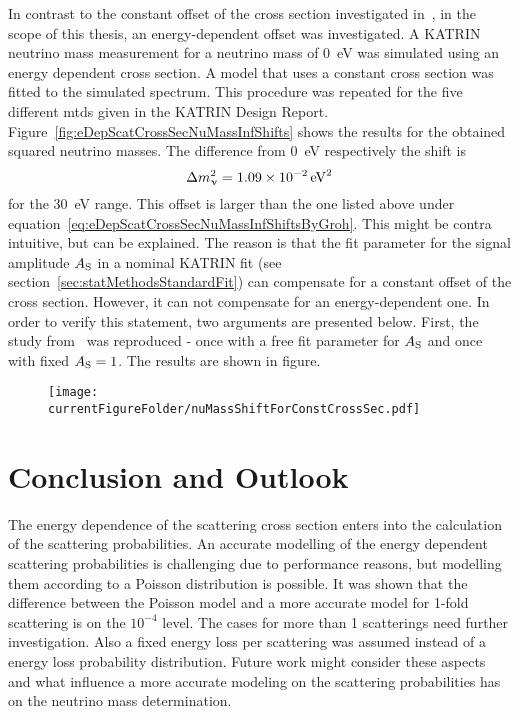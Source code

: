 In contrast to the constant offset of the cross section investigated in~\cite{Groh2015}, in the scope of this thesis, an energy-dependent offset was investigated. A KATRIN neutrino mass measurement for a neutrino mass of \SI{0}{eV} was simulated using an energy dependent cross section. A model that uses a constant cross section was fitted to the simulated spectrum. This procedure was repeated for the five different \gls{mtd}s given in the KATRIN Design Report. Figure~\ref{fig:eDepScatCrossSecNuMassInfShifts} shows the results for the obtained squared neutrino masses. The difference from \SI{0}{eV} respectively the shift is
\begin{equation}
	\Delta m_\upnu^2 = \SI{1.09e-2}{eV^2}
\end{equation}
for the \SI{30}{eV} range. This offset is larger than the one listed above under equation~\eqref{eq:eDepScatCrossSecNuMassInfShiftsByGroh}. This might be contra intuitive, but can be explained. The reason is that the fit parameter for the signal amplitude $A_{\mathrm{S}}$ in a nominal KATRIN fit (see section~\ref{sec:statMethodsStandardFit}) can compensate for a constant offset of the cross section. However, it can not compensate for an energy-dependent one. In order to verify this statement, two arguments are presented below.
First, the study from~\cite{Groh2015} was reproduced - once with a free fit parameter for $A_{\mathrm{S}}$ and once with fixed $A_{\mathrm{S}}=1$. The results are shown in figure.





\begin{figure}[t]
	\texttt{[image: \\currentFigureFolder/nuMassShiftForConstCrossSec.pdf]}
	\xcaption{}{}{}
	\label{fig:eDepScatCrossSecNuMassInfShiftsForConstCrossSec}
\end{figure}

\section{Conclusion and Outlook}
\label{sec:eDepScatCrossSecConclusion}
The energy dependence of the scattering cross section enters into the calculation of the scattering probabilities. An accurate modelling of the energy dependent scattering probabilities is challenging due to performance reasons, but modelling them according to a Poisson distribution is possible. It was shown that the difference between the Poisson model and a more accurate model for 1-fold scattering is on the $10^{-4}$ level. The cases for more than 1 scatterings need further investigation. Also a fixed energy loss per scattering was assumed instead of a energy loss probability distribution. Future work might consider these aspects and what influence a more accurate modeling on the scattering probabilities has on the neutrino mass determination.

